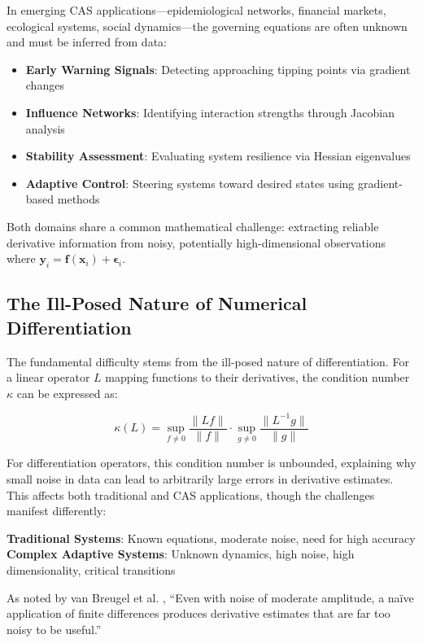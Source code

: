 \documentclass[10pt,journal,compsoc]{IEEEtran}
\begin{document}
In emerging CAS applications---epidemiological networks, financial markets, ecological systems, social dynamics---the governing equations are often unknown and must be inferred from data:
\begin{itemize}
    \item \textbf{Early Warning Signals}: Detecting approaching tipping points via gradient changes
    \item \textbf{Influence Networks}: Identifying interaction strengths through Jacobian analysis
    \item \textbf{Stability Assessment}: Evaluating system resilience via Hessian eigenvalues
    \item \textbf{Adaptive Control}: Steering systems toward desired states using gradient-based methods
\end{itemize}

Both domains share a common mathematical challenge: extracting reliable derivative information from noisy, potentially high-dimensional observations where $\mathbf{y}_i = \mathbf{f}(\mathbf{x}_i) + \boldsymbol{\epsilon}_i$.

\subsection{The Ill-Posed Nature of Numerical Differentiation}

The fundamental difficulty stems from the ill-posed nature of differentiation. For a linear operator $L$ mapping functions to their derivatives, the condition number $\kappa$ can be expressed as:

\begin{equation}
\kappa(L) = \sup_{f \neq 0} \frac{\|Lf\|}{\|f\|} \cdot \sup_{g \neq 0} \frac{\|L^{-1}g\|}{\|g\|}
\end{equation}

For differentiation operators, this condition number is unbounded, explaining why small noise in data can lead to arbitrarily large errors in derivative estimates. This affects both traditional and CAS applications, though the challenges manifest differently:

\textbf{Traditional Systems}: Known equations, moderate noise, need for high accuracy\\
\textbf{Complex Adaptive Systems}: Unknown dynamics, high noise, high dimensionality, critical transitions

As noted by van Breugel et al. \cite{van2021numerical}, ``Even with noise of moderate amplitude, a naïve application of finite differences produces derivative estimates that are far too noisy to be useful.''
\end{document}
